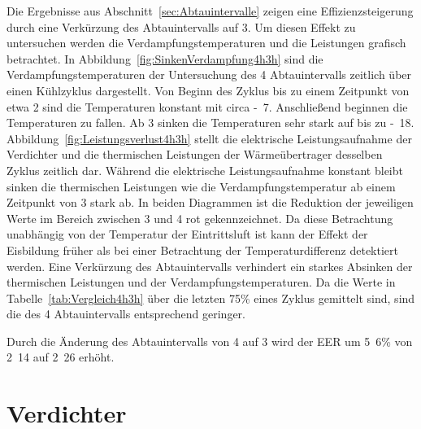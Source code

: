 Die Ergebnisse aus Abschnitt~\ref{sec:Abtauintervalle} zeigen eine Effizienzsteigerung durch eine Verkürzung des Abtauintervalls auf \unit{3}{\hour}. Um diesen Effekt zu untersuchen werden die Verdampfungstemperaturen und die Leistungen grafisch betrachtet.
In Abbildung~\ref{fig:SinkenVerdampfung4h3h} sind die Verdampfungstemperaturen der Untersuchung des \unit{4}{\hour} Abtauintervalls zeitlich über einen Kühlzyklus dargestellt. Von Beginn des Zyklus bis zu einem Zeitpunkt von etwa \unit{2}{\hour} sind die Temperaturen konstant mit circa \unit{-7}{\celsius}. Anschließend beginnen die Temperaturen zu fallen. Ab \unit{3}{\hour} sinken die Temperaturen sehr stark auf bis zu \unit{-18}{\celsius}.
Abbildung~\ref{fig:Leistungsverlust4h3h} stellt die elektrische Leistungsaufnahme der Verdichter und die thermischen Leistungen der Wärmeübertrager desselben Zyklus zeitlich dar. Während die elektrische Leistungsaufnahme konstant bleibt sinken die thermischen Leistungen wie die Verdampfungstemperatur ab einem Zeitpunkt von \unit{3}{\hour} stark ab. In beiden Diagrammen ist die Reduktion der jeweiligen Werte im Bereich zwischen \unit{3}{\hour} und \unit{4}{\hour} rot gekennzeichnet. \newline
Da diese Betrachtung unabhängig von der Temperatur der Eintrittsluft ist kann der Effekt der Eisbildung früher als bei einer Betrachtung der Temperaturdifferenz detektiert werden. Eine Verkürzung des Abtauintervalls verhindert ein starkes Absinken der thermischen Leistungen und der Verdampfungstemperaturen. Da die Werte in Tabelle~\ref{tab:Vergleich4h3h} über die letzten \unit{75}{\%} eines Zyklus gemittelt sind, sind die des \unit{4}{\hour} Abtauintervalls entsprechend geringer.

Durch die Änderung des Abtauintervalls von \unit{4}{\hour} auf \unit{3}{\hour} wird der EER um \unit{5.6}{\%} von \unit{2.14}{} auf \unit{2.26}{} erhöht.















\section{Verdichter}
\label{sec:VerdichterAnalyse}

